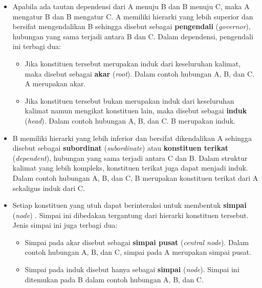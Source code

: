 \begin{itemize}
\item Apabila ada tautan dependensi dari A menuju B dan B menuju C, maka A mengatur B dan B mengatur C. A memiliki hierarki yang lebih superior dan bersifat mengendalikan B sehingga disebut sebagai \textbf{pengendali} (\textit{governor}), hubungan yang sama terjadi antara B dan C. Dalam dependensi, pengendali ini terbagi dua:
\begin{itemize} 
\item Jika konstituen tersebut merupakan induk dari keseluruhan kalimat, maka disebut sebagai \textbf{akar} (\textit{root}). Dalam contoh hubungan A, B, dan C. A merupakan akar.
\item Jika konstituen tersebut bukan merupakan induk dari keseluruhan kalimat namun mengikat konstituen lain, maka disebut sebagai \textbf{induk} (\textit{head}). Dalam contoh hubungan A, B, dan C. B merupakan induk.
\end{itemize}
\item B memiliki hierarki yang lebih inferior dan bersifat dikendalikan A sehingga disebut sebagai \textbf{subordinat} (\textit{subordinate}) atau \textbf{konstituen terikat} (\textit{dependent}), hubungan yang sama terjadi antara C dan B. Dalam struktur kalimat yang lebih kompleks, konstituen terikat juga dapat menjadi induk. Dalam contoh hubungan A, B, dan C, B merupakan konstituen terikat dari A sekaligus induk dari C.
\item Setiap konstituen yang utuh dapat berinteraksi untuk membentuk \textbf{simpai} (\textit{node}) \citep{tesniere1959elements}. Simpai ini dibedakan tergantung dari hierarki konstituen tersebut. Jenis simpai ini juga terbagi dua:
\begin{itemize}
\item Simpai pada akar disebut sebagai \textbf{simpai pusat} (\textit{central node}). Dalam contoh hubungan A, B, dan C, simpai pada A merupakan simpai pusat.
\item Simpai pada induk disebut hanya sebagai \textbf{simpai} (\textit{node}). Simpai ini ditemukan pada B dalam contoh hubungan A, B, dan C.
\end{itemize}
\end{itemize}

